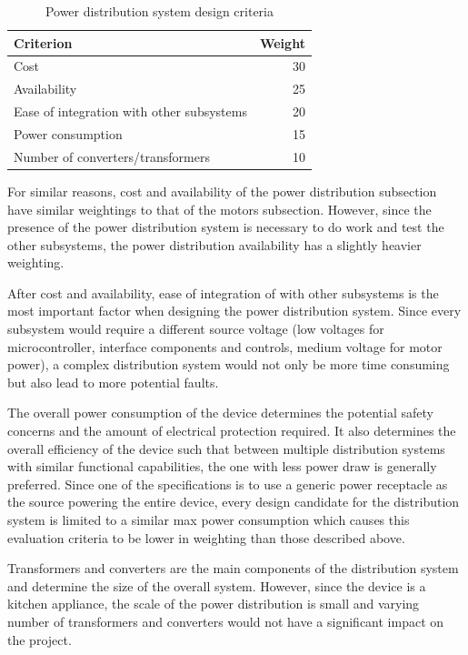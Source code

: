\documentclass[11pt]{article}
\begin{document}
\begin{table}[H]
\begin{tabularx}{\textwidth}{X  r}

\hline

Criterion & Weight \\

\hline

Cost & 30 \\
Availability & 25 \\
Ease of integration with other subsystems & 20 \\
Power consumption & 15 \\
Number of converters/transformers & 10 \\

\hline

\end{tabularx}
\caption{Power distribution system design criteria}
\label{table:power criteria}
\end{table}

For similar reasons, cost and availability of the power distribution subsection have similar weightings to that of the motors subsection.
However, since the presence of the power distribution system is necessary to do work and test the other subsystems, the power distribution availability has a slightly heavier weighting.

After cost and availability, ease of integration of with other subsystems is the most important factor when designing the power distribution system.
Since every subsystem would require a different source voltage (low voltages for microcontroller, interface components and controls, medium voltage for motor power), a complex distribution system would not only be more time consuming but also lead to more potential faults.

The overall power consumption of the device determines the potential safety concerns and the amount of electrical protection required.
It also determines the overall efficiency of the device such that between multiple distribution systems with similar functional capabilities, the one with less power draw is generally preferred.
Since one of the specifications is to use a generic power receptacle as the source powering the entire device, every design candidate for the distribution system is limited to a similar max power consumption which causes this evaluation criteria to be lower in weighting than those described above.

Transformers and converters are the main components of the distribution system and determine the size of the overall system.
However, since the device is a kitchen appliance, the scale of the power distribution is small and varying number of transformers and converters would not have a significant impact on the project.
\end{document}
